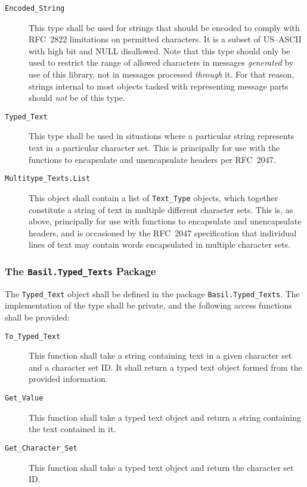 \documentclass[11pt]{article}
\begin{document}
\begin{description}

\item[\texttt{Encoded\_String}] This type shall be used for strings
  that should be encoded to comply with RFC~2822 limitations on
  permitted characters. It is a subset of US--ASCII with high bit and
  NULL disallowed. Note that this type should only be used to restrict
  the range of allowed characters in messages \emph{generated} by use
  of this library, not in messages processed \emph{through} it. For
  that reason, strings internal to most objects tasked with
  representing message parts should \emph{not} be of this type.

\item[\texttt{Typed\_Text}] This type shall be used in situations
  where a particular string represents text in a particular character
  set. This is principally for use with the functions to encapsulate
  and unencapsulate headers per RFC~2047.

\item[\texttt{Multitype\_Texts.List}] This object shall contain a list
  of \texttt{Text\_Type} objects, which together constitute a string of
  text in multiple different character sets. This is, as above,
  principally for use with functions to encapsulate and unencapsulate
  headers, and is occasioned by the RFC~2047 specification that
  individual lines of text may contain words encapsulated in multiple
  character sets.

\end{description}

\subsubsection{The \texttt{Basil.Typed\_Texts} Package}

The \texttt{Typed\_Text} object shall be defined in the package
\texttt{Basil.Typed\_Texts}. The implementation of the type shall be
private, and the following access functions shall be provided:

\begin{description} 

\item[\texttt{To\_Typed\_Text}] This function shall take a string
  containing text in a given character set and a character set ID. It
  shall return a typed text object formed from the provided
  information.

\item[\texttt{Get\_Value}] This function shall take a typed text
  object and return a string containing the text contained in it.

\item[\texttt{Get\_Character\_Set}] This function shall take a typed
  text object and return the character set ID.

\end{description}
\end{document}
